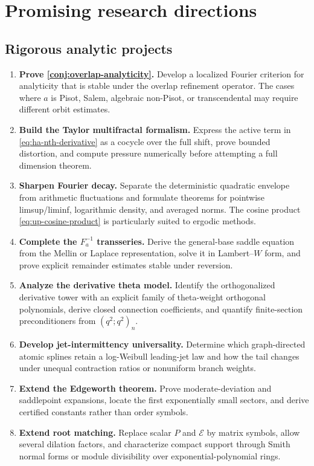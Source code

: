 \documentclass[11pt,oneside]{article}
\theoremstyle{definition}
\theoremstyle{remark}
\begin{document}
\section{Promising research directions}
\label{sec:future}

\subsection{Rigorous analytic projects}

\begin{enumerate}[label=\arabic*.]
  \item \textbf{Prove \cref{conj:overlap-analyticity}.}  Develop a localized Fourier criterion for analyticity that is stable under the overlap refinement operator.  The cases where \(a\) is Pisot, Salem, algebraic non-Pisot, or transcendental may require different orbit estimates.

  \item \textbf{Build the Taylor multifractal formalism.}  Express the active term in \eqref{eq:ha-nth-derivative} as a cocycle over the full shift, prove bounded distortion, and compute pressure numerically before attempting a full dimension theorem.

  \item \textbf{Sharpen Fourier decay.}  Separate the deterministic quadratic envelope from arithmetic fluctuations and formulate theorems for pointwise limsup/liminf, logarithmic density, and averaged norms.  The cosine product \eqref{eq:up-cosine-product} is particularly suited to ergodic methods.

  \item \textbf{Complete the \(F_a^{-1}\) transseries.}  Derive the general-base saddle equation from the Mellin or Laplace representation, solve it in Lambert--\(W\) form, and prove explicit remainder estimates stable under reversion.

  \item \textbf{Analyze the derivative theta model.}  Identify the orthogonalized derivative tower with an explicit family of theta-weight orthogonal polynomials, derive closed connection coefficients, and quantify finite-section preconditioners from \((q^2;q^2)_n\).

  \item \textbf{Develop jet-intermittency universality.}  Determine which graph-directed atomic splines retain a log-Weibull leading-jet law and how the tail changes under unequal contraction ratios or nonuniform branch weights.

  \item \textbf{Extend the Edgeworth theorem.}  Prove moderate-deviation and saddlepoint expansions, locate the first exponentially small sectors, and derive certified constants rather than order symbols.

  \item \textbf{Extend root matching.}  Replace scalar \(P\) and \(\mathcal E\) by matrix symbols, allow several dilation factors, and characterize compact support through Smith normal forms or module divisibility over exponential-polynomial rings.
\end{enumerate}
\end{document}
